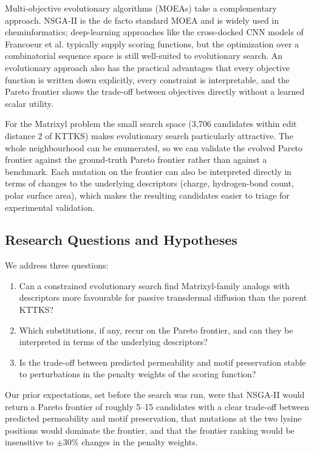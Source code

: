 \documentclass[11pt,letterpaper]{article}
\begin{document}
Multi-objective evolutionary algorithms (MOEAs) take a complementary approach. NSGA-II\cite{nsga2} is the de facto standard MOEA and is widely used in cheminformatics; deep-learning approaches like the cross-docked CNN models of Francoeur et al.\cite{francoeur2020} typically supply scoring functions, but the optimization over a combinatorial sequence space is still well-suited to evolutionary search. An evolutionary approach also has the practical advantages that every objective function is written down explicitly, every constraint is interpretable, and the Pareto frontier shows the trade-off between objectives directly without a learned scalar utility.

For the Matrixyl problem the small search space (3,706 candidates within edit distance 2 of KTTKS) makes evolutionary search particularly attractive. The whole neighbourhood can be enumerated, so we can validate the evolved Pareto frontier against the ground-truth Pareto frontier rather than against a benchmark. Each mutation on the frontier can also be interpreted directly in terms of changes to the underlying descriptors (charge, hydrogen-bond count, polar surface area), which makes the resulting candidates easier to triage for experimental validation.

\subsection{Research Questions and Hypotheses}

We address three questions:

\begin{enumerate}
  \item Can a constrained evolutionary search find Matrixyl-family analogs with descriptors more favourable for passive transdermal diffusion than the parent KTTKS?
  \item Which substitutions, if any, recur on the Pareto frontier, and can they be interpreted in terms of the underlying descriptors?
  \item Is the trade-off between predicted permeability and motif preservation stable to perturbations in the penalty weights of the scoring function?
\end{enumerate}

Our prior expectations, set before the search was run, were that NSGA-II would return a Pareto frontier of roughly 5--15 candidates with a clear trade-off between predicted permeability and motif preservation, that mutations at the two lysine positions would dominate the frontier, and that the frontier ranking would be insensitive to $\pm 30\%$ changes in the penalty weights.
\end{document}
